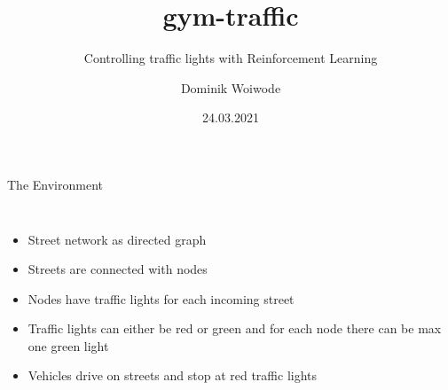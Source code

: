 \documentclass[aspectratio=43,t,xcolor={usenames,dvipsnames}]{beamer}
\title{gym-traffic}
\subtitle{Controlling traffic lights with Reinforcement Learning}
\author{Dominik Woiwode}
\date{24.03.2021}
\begin{document}
    \maketitle
    \begin{frame}[c]{The Environment}
        \begin{columns}




            \begin{itemize}
                \item Street network as directed graph
                \item Streets are connected with nodes
                \item Nodes have traffic lights for each incoming street
                \item Traffic lights can either be red or green and for each node there can be max one green light
                \item Vehicles drive on streets and stop at red traffic lights
            \end{itemize}


        \end{columns}
    \end{frame}

\end{document}
